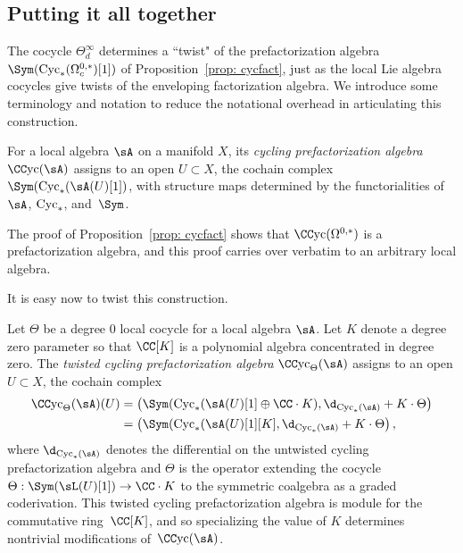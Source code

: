 

\subsection{Putting it all together}

The cocycle $\Theta_d^\infty$ determines a ``twist" of the prefactorization algebra $\Sym(\cycls(\Omega^{0,*}_c)[1])$
of Proposition~\ref{prop: cycfact},
just as the local Lie algebra cocycles give twists of the enveloping factorization algebra.
We introduce some terminology and notation to reduce the notational overhead in articulating this construction.

\def\CCyc{{\CC}{\rm yc}}

\begin{dfn}
For a local algebra $\sA$ on a manifold $X$, its {\em cycling prefactorization algebra} $\CCyc(\sA)$ assigns to an open $U \subset X$, the cochain complex $\Sym(\Cyc_*(\sA(U)[1])$,
with structure maps determined by the functorialities of $\sA$, ${\rm Cyc}_*$, and~$\Sym$.
\end{dfn}

The proof of Proposition~\ref{prop: cycfact} shows that $\CCyc(\Omega^{0,*})$ is a prefactorization algebra,
and this proof carries over verbatim to an arbitrary local algebra.

It is easy now to twist this construction.

\begin{dfn}
Let $\Theta$ be a degree 0 local cocycle for a local algebra $\sA$. 
Let $K$ denote a degree zero parameter so that $\CC[K]$ is a polynomial algebra concentrated in degree zero.
The {\em twisted cycling prefactorization algebra} $\CCyc_\Theta(\sA)$ assigns to an open $U \subset X$, the cochain complex
\begin{align*}
\CCyc_\Theta(\sA)(U) & = \left(\Sym(\Cyc_*(\sA(U)[1] \oplus \CC \cdot K), \d_{\Cyc_*(\sA)} + K \cdot \Theta\right) \\
& = \left(\Sym(\Cyc_*(\sA(U)[1][K] , \d_{\Cyc_*(\sA)} + K \cdot \Theta\right),
\end{align*}
where $ \d_{\Cyc_*(\sA)}$ denotes the differential on the untwisted cycling prefactorization algebra and $\Theta$ is the operator extending the cocycle $\Theta : \Sym(\sL(U)[1]) \to \CC \cdot K$ to the symmetric coalgebra as a graded coderivation.
This twisted cycling prefactorization algebra is module for the commutative ring~$\CC[K]$,
and so specializing the value of $K$ determines nontrivial modifications of~$\CCyc(\sA)$. 
\end{dfn}

